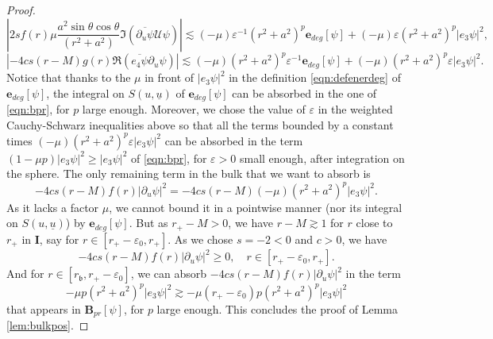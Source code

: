 \documentclass[reqno]{amsart}
\numberwithin{equation}{section}
\newcommand{\ubar}{{\underline{u}}}
\newcommand{\ener}{\mathbf{e}}
\newcommand{\un}{\mathbf{I}}
\newcommand{\rb}{r_\mathfrak{b}}
\theoremstyle{plain}
\theoremstyle{definition}
\theoremstyle{remark}
\numberwithin{equation}{section}
\begin{document}
\begin{proof}
$$\left|2sf(r)\mu\dfrac{a^2\sin\theta\cos\theta}{(r^2+a^2)}\mathfrak{I}(\overline{\partial_u\psi}\mathcal{U}\psi)\right|\lesssim(-\mu)\varepsilon^{-1}(r^2+a^2)^p\ener_{deg}[\psi]+(-\mu)\varepsilon(r^2+a^2)^p|e_3\psi|^2,$$
$$|-4cs(r-M)g(r)\mathfrak{R}(\overline{e_4\psi}\partial_u\psi)|\lesssim (-\mu)(r^2+a^2)^p\varepsilon^{-1}\ener_{deg}[\psi]+(-\mu)(r^2+a^2)^p\varepsilon|e_3\psi|^2.$$
Notice that thanks to the $\mu$ in front of $|e_3\psi|^2$ in the definition \eqref{eqn:defenerdeg} of $\ener_{deg}[\psi]$, the integral on ${S(u,\ubar)}$ of $\ener_{deg}[\psi]$ can be absorbed in the one of \eqref{eqn:bpr}, for $p$ large enough. Moreover, we chose the value of $\varepsilon$ in the weighted Cauchy-Schwarz inequalities above so that all the terms bounded by a constant times $(-\mu)(r^2+a^2)^p\varepsilon|e_3\psi|^2$ can be absorbed in the term $(1-\mu p)|e_3\psi|^2\geq|e_3\psi|^2$ of \eqref{eqn:bpr}, for $\varepsilon>0$ small enough, after integration on the sphere. The only remaining term in the bulk that we want to absorb is
$$-4cs(r-M)f(r)|\partial_u\psi|^2=-4cs(r-M)(-\mu)(r^2+a^2)^p|e_3\psi|^2.$$ 
As it lacks a factor $\mu$, we cannot bound it in a pointwise manner (nor its integral on ${S(u,\ubar)}$) by $\ener_{deg}[\psi]$. But as $r_+-M>0$, we have $r-M\gtrsim 1$ for $r$ close to $r_+$ in $\un$, say for $r\in[r_+-\varepsilon_0,r_+]$. As we chose $s=-2<0$ and $c>0$, we have
$$-4cs(r-M)f(r)|\partial_u\psi|^2\geq 0,\quad r\in[r_+-\varepsilon_0,r_+].$$
And for $r\in [\rb,r_+-\varepsilon_0]$, we can absorb $-4cs(r-M)f(r)|\partial_u\psi|^2$ in the term 
$$-\mu p(r^2+a^2)^p|e_3\psi|^2\gtrsim -\mu(r_+-\varepsilon_0)p(r^2+a^2)^p|e_3\psi|^2$$
that appears in $\mathbf{B}_{pr}[\psi]$, for $p$ large enough. This concludes the proof of Lemma \ref{lem:bulkpos}.
\end{proof}
\end{document}
